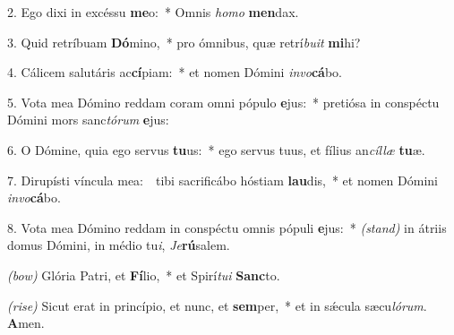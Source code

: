 2. Ego dixi in excéssu \textbf{me}o:~* Omnis \textit{ho}\textit{mo} \textbf{men}dax.

3. Quid retríbuam \textbf{Dó}mino,~* pro ómnibus, quæ retrí\textit{bu}\textit{it} \textbf{mi}hi?

4. Cálicem salutáris ac\textbf{cí}piam:~* et nomen Dómini \textit{in}\textit{vo}\textbf{cá}bo.

5. Vota mea Dómino reddam coram omni pópulo \textbf{e}jus:~* pretiósa in conspéctu Dómini mors sanc\textit{tó}\textit{rum} \textbf{e}jus:

6. O Dómine, quia ego servus \textbf{tu}us:~* ego servus tuus, et fílius an\textit{cíl}\textit{læ} \textbf{tu}æ.

7. Dirupísti víncula mea:~\GreDagger\ tibi sacrificábo hóstiam \textbf{lau}dis,~* et nomen Dómini \textit{in}\textit{vo}\textbf{cá}bo.

8. Vota mea Dómino reddam in conspéctu omnis pópuli \textbf{e}jus:~* {\color{red}\textit{(stand)}} in átriis domus Dómini, in médio tu\textit{i}, \textit{Je}\textbf{rú}salem.

{\color{red}\textit{(bow)}} Glória Patri, et \textbf{Fí}lio,~* et Spirí\textit{tu}\textit{i} \textbf{Sanc}to.

{\color{red}\textit{(rise)}} Sicut erat in princípio, et nunc, et \textbf{sem}per,~* et in s\'{\ae}cula sæcu\textit{ló}\textit{rum}. \textbf{A}men.